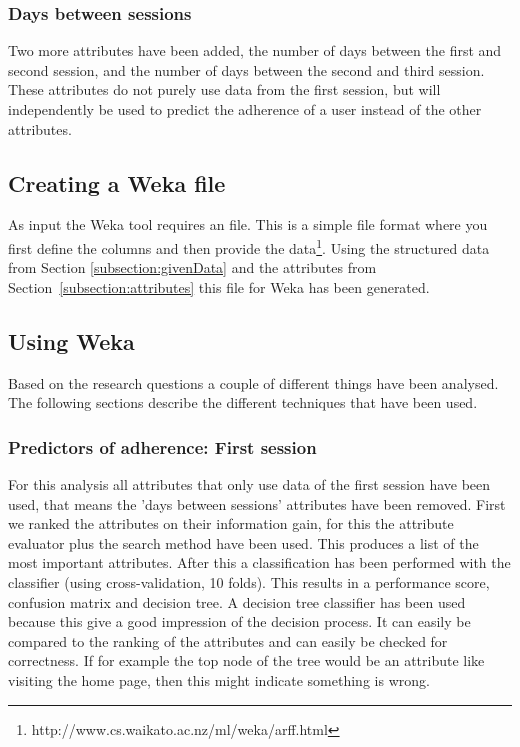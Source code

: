 \subsubsection{Days between sessions}
Two more attributes have been added, the number of days between the first and second session, and the number of days between the second and third session. These attributes do not purely use data from the first session, but will independently be used to predict the adherence of a user instead of the other attributes.

\subsection{Creating a Weka file}
As input the Weka tool requires an  file. This is a simple file format where you first define the columns and then provide the data\footnote{http://www.cs.waikato.ac.nz/ml/weka/arff.html}. Using the structured data from Section \ref{subsection:givenData} and the attributes from Section~\ref{subsection:attributes} this file for Weka has been generated.

\subsection{Using Weka} \label{subsection:usingWeka}
Based on the research questions a couple of different things have been analysed. The following sections describe the different techniques that have been used.

\subsubsection{Predictors of adherence: First session}
For this analysis all attributes that only use data of the first session have been used, that means the 'days between sessions' attributes have been removed. First we ranked the attributes on their information gain, for this the  attribute evaluator plus the  search method have been used. This produces a list of the most important attributes. After this a classification has been performed with the  classifier (using cross-validation, 10 folds). This results in a performance score, confusion matrix and decision tree. A decision tree classifier has been used because this give a good impression of the decision process. It can easily be compared to the ranking of the attributes and can easily be checked for correctness. If for example the top node of the tree would be an attribute like visiting the home page, then this might indicate something is wrong.

